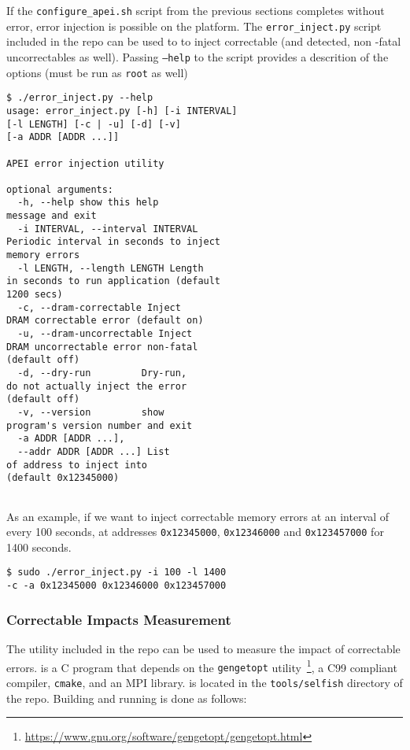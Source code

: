 If the {\texttt{configure\_apei.sh}} script from the previous sections completes
without error, error injection is possible on the platform.  The
{\texttt{error\_inject.py}} script included in the repo can be used to to inject
correctable (and detected, non -fatal uncorrectables as well).  Passing {\texttt{--help}}
to the script provides a descrition of the options (must be run as
{\texttt{root}} as well)

\begin{Verbatim}[commandchars=\\\{\},frame=single]
 $ ./error_inject.py --help
usage: error_inject.py [-h] [-i INTERVAL]
[-l LENGTH] [-c | -u] [-d] [-v]
[-a ADDR [ADDR ...]]

APEI error injection utility

optional arguments:
  -h, --help show this help
message and exit
  -i INTERVAL, --interval INTERVAL
Periodic interval in seconds to inject
memory errors
  -l LENGTH, --length LENGTH Length
in seconds to run application (default
1200 secs)
  -c, --dram-correctable Inject
DRAM correctable error (default on)
  -u, --dram-uncorrectable Inject
DRAM uncorrectable error non-fatal
(default off)
  -d, --dry-run         Dry-run,
do not actually inject the error
(default off)
  -v, --version         show
program's version number and exit
  -a ADDR [ADDR ...],
  --addr ADDR [ADDR ...] List
of address to inject into
(default 0x12345000)
 
\end{Verbatim}

As an example, if we want to inject correctable memory errors at an interval of
every 100 seconds, at addresses {\texttt{0x12345000}}, {\texttt{0x12346000}} and
{\texttt{0x123457000}} for 1400 seconds.

\begin{Verbatim}[commandchars=\\\{\},frame=single]
 $ sudo ./error_inject.py -i 100 -l 1400
-c -a 0x12345000 0x12346000 0x123457000
\end{Verbatim}

\subsubsection{Correctable Impacts Measurement}

The \selfish utility included in the repo can be used to measure the impact of
correctable errors.  \selfish is a C program that depends on the
{\texttt{gengetopt}}
utility~\footnote{\url{https://www.gnu.org/software/gengetopt/gengetopt.html}},
a C99 compliant compiler, {\texttt{cmake}}, and an MPI library. \selfish is
located in the {\texttt{tools/selfish}} directory of the repo.  Building and
running is done as follows:


